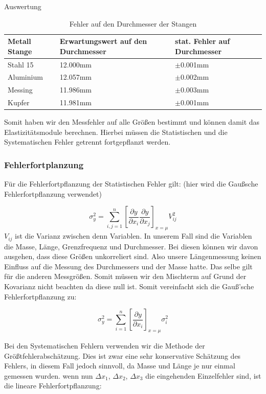 \documentclass[twoside]{protokoll}
\begin{document}
\begin{aufgabe}{Auswertung}
 \begin{table}[H]
        \centering
        \begin{tabularx}{1.0\textwidth}{X X X} %
            \toprule
            \textbf{Metall Stange} & \textbf{Erwartungswert auf den Durchmesser} & \textbf{stat. Fehler auf Durchmesser} \\
            \midrule
            Stahl 15 & 12.000mm & $\pm$0.001mm \\
            Aluminium & 12.057mm & $\pm$0.002mm  \\
            Messing & 11.986mm & $\pm$0.003mm \\
            Kupfer & 11.981mm & $\pm$0.001mm \\
            \bottomrule
        \end{tabularx}
        \caption{Fehler auf den Durchmesser der Stangen}
        \label{tab:mytable}
    \end{table}

Somit haben wir den Messfehler auf alle Größen bestimmt und können damit das Elastizitätsmodule berechnen. Hierbei müssen die Statistischen und die Systematischen Fehler getrennt fortgepflanzt werden.
\subsubsection{Fehlerfortplanzung}
Für die Fehlerfortpflanzung der Statistischen Fehler gilt: (hier wird die Gaußsche Fehlerfortpflanzung verwendet) 

\begin{equation}
	\sigma_y^2 = \sum_{i,j=1}^n\left[\frac{\partial y}{\partial x_i}\frac{\partial y}{\partial x_j}\right]_{x=\mu}V_{ij}^2
\end{equation}
$V_{ij}$ ist die Varianz zwischen denn Variablen. In unserem Fall sind die Variablen die Masse, Länge, Grenzfrequenz und Durchmesser. 
Bei diesen können wir davon ausgehen, dass diese Größen unkorreliert sind. 
Also unsere Längenmessung keinen Einfluss auf die Messung des Durchmessers und der Masse hatte.
Das selbe gilt für die anderen Messgrößen. 
Somit müssen wir den Mischterm auf Grund der Kovarianz nicht beachten da diese null ist.
Somit vereinfacht sich die Gauß'sche Fehlerfortpflanzung zu:

\begin{equation}
	\sigma_y^2 = \sum_{i=1}^n\left[\frac{\partial y}{\partial x_i}\right]_{x=\mu}\sigma_{i}^2
\end{equation}

Bei den Systematischen Fehlern verwenden wir die Methode der Größtfehlerabschätzung. 
Dies ist zwar eine sehr konservative Schätzung des Fehlers, in diesem Fall jedoch sinnvoll,
da Masse und Länge je nur einmal gemessen wurden. wenn nun $\Delta x_1$, $\Delta x_2$, $\Delta x_3$
die eingehenden Einzelfehler sind, ist die lineare Fehlerfortpflanzung: \\


\end{aufgabe}
\end{document}
